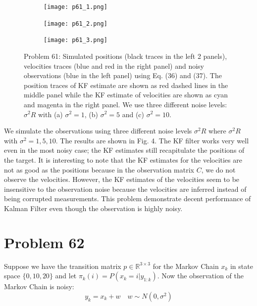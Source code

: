 \documentclass[a4paper, 11pt]{article}
\begin{document}
\begin{figure}
\centering
\begin{subfigure}[]{}
   \texttt{[image: p61\_1.png]}
\end{subfigure}

\begin{subfigure}[]{}
   \texttt{[image: p61\_2.png]}
\end{subfigure}

\begin{subfigure}[]{}
   \texttt{[image: p61\_3.png]}
\end{subfigure}

\caption{Problem 61: Simulated positions (black traces in the left 2 panels), velocities traces (blue and red in the right panel) and noisy observations (blue in the left panel) using Eq. (36) and (37). The position traces of KF estimate are shown as red dashed lines in the middle panel while the KF estimate of velocities are shown as cyan and magenta in the right panel. We use three different noise levels: $\sigma^2R$ with (a) $\sigma^2=1$, (b) $\sigma^2=5$ and (c) $\sigma^2=10$.}
\end{figure}


We simulate the observations using three different noise levels $\sigma^2R$ where $\sigma^2R$ with $\sigma^2=1,5,10$. The results are shown in Fig. 4. The KF filter works very well even in the most noisy case; the KF estimates still recapitulate the positions of the target. It is interesting to note that the KF estimates for the velocities are not as good as the positions because in the observation matrix $C$, we do not observe the velocities. However, the KF estimates of the velocities seem to be insensitive to the observation noise because the velocities are inferred instead of being corrupted measurements. This problem demonstrate decent performance of Kalman Filter even though the observation is highly noisy. 






\section*{Problem 62}

Suppose we have the transition matrix $p\in\mathbb{R}^{3\times 3}$ for the Markov Chain $x_k$ in state space $\{0, 10, 20\}$ and let $\pi_k(i) = P(x_k=i|y_{1:k})$. Now the observation of the Markov Chain is noisy: 
\begin{equation}
y_{k} = x_k + w \quad w\sim N(0, \sigma^2)
\end{equation}
\end{document}
